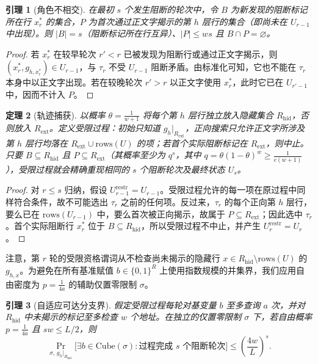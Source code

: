 \documentclass[11pt,a4paper]{article}
\newtheorem{theorem}{定理}[section]
\newtheorem{lemma}[theorem]{引理}
\theoremstyle{definition}
\theoremstyle{remark}
\newcommand{\Prb}{\Pr}
\begin{document}
\begin{lemma}[角色不相交]
\label{lem:role-disjoint}
在最初 $s$ 个发生阻断的轮次中，令 $B$ 为新发现的阻断标记所在行 $x_r^*$ 的集合，$P$ 为\emph{首次}通过正文字揭示的第 $h$ 层行的集合（即尚未在 $U_{r-1}$ 中出现）。则 $|B|=s$（阻断标记所在行互异）、$|P|\le ws$ 且 $B\cap P=\varnothing$。
\end{lemma}

\begin{proof}
若 $x_r^*$ 在较早轮次 $r'<r$ 已被发现为阻断行或通过正文字揭示，则 $(x_r^*,g_{h,x_r^*})\in U_{r-1}$，与 $\tau_r$ 不受 $U_{r-1}$ 阻断矛盾。由标准化可知，它也不能在 $\tau_r$ 本身中以正文字出现。若在较晚轮次 $r'>r$ 以正文字使用 $x_r^*$，此时它已在 $U_{r'-1}$ 中，因而不计入 $P$。
\end{proof}

\begin{theorem}[轨迹捕获]
\label{thm:trace-capture}
以概率 $\theta=\frac{1}{w+1}$ 将每个第 $h$ 层行独立放入隐藏集合 $R_{\mathrm{hid}}$，否则放入 $R_{\mathrm{ext}}$。定义受限过程：初始只知道 $g_h|_{R_{\mathrm{ext}}}$，正向搜索只允许正文字所涉及第 $h$ 层行均落在 $R_{\mathrm{ext}}\cup\mathrm{rows}(U)$ 的项；若首个实际阻断标记在 $R_{\mathrm{ext}}$，则中止。只要 $B\subseteq R_{\mathrm{hid}}$ 且 $P\subseteq R_{\mathrm{ext}}$（其概率至少为 $q^s$，其中 $q=\theta(1-\theta)^w\ge\frac1{e(w+1)}$），受限过程就会精确重现相同的 $s$ 个阻断轮次及最终状态 $U_s$。
\end{theorem}

\begin{proof}
对 $r\le s$ 归纳，假设 $U_{r-1}^{\mathrm{restr}}=U_{r-1}$。受限过程允许的每一项在原过程中同样符合条件，故不可能选出 $\tau_r$ 之前的任何项。反过来，$\tau_r$ 的每个正向第 $h$ 层行，要么已在 $\mathrm{rows}(U_{r-1})$ 中，要么首次被正向揭示，故属于 $P\subseteq R_{\mathrm{ext}}$；因此选中 $\tau_r$。首个实际阻断行 $x_r^*$ 位于 $B\subseteq R_{\mathrm{hid}}$，所以受限过程不中止，并产生 $U_r^{\mathrm{restr}}=U_r$。
\end{proof}

注意，第 $r$ 轮的受限资格谓词从不检查尚未揭示的隐藏行 $x\in R_{\mathrm{hid}}\setminus\mathrm{rows}(U)$ 的 $g_{h,x}$。为避免在所有基准赋值 $b\in\{0,1\}^R$ 上使用指数规模的并集界，我们应用自由密度为 $p=\frac1{4a}$ 的辅助仅置零限制 $\sigma$。

\begin{lemma}[自适应可达分支界]
\label{lem:reachable-branch}
假定受限过程每轮对基变量 $b$ 至多查询 $a$ 次，并对 $R_{\mathrm{hid}}$ 中未揭示的标记至多检查 $w$ 个地址。在独立的仅置零限制 $\sigma$ 下，若自由概率 $p=\frac1{4a}$ 且 $sw\le L/2$，则
\[
  \Prb_{\sigma,\, g_h|_{R_{\mathrm{hid}}}}\bigl[\exists b \in \mathrm{Cube}(\sigma) : \text{过程完成 } s \text{ 个阻断轮次}\bigr]
  \le \left(\frac{4w}{L}\right)^s.
\]
\end{lemma}
\end{document}
